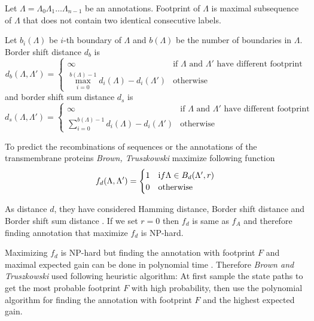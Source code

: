 \begin{definition}
Let $\Lambda=\Lambda_0\Lambda_1\dots\Lambda_{n-1}$ be an annotations. Footprint
of $\Lambda$ is maximal subsequence of $\Lambda$ that does not contain two
identical 
consecutive labels. \label{DEFINITION::FOOTPRINT}
\end{definition}

\begin{definition}
Let $b_i(\Lambda)$ be $i$-th boundary of $\Lambda$ and $b(\Lambda)$ be the
number of boundaries in $\Lambda$.
Border shift distance $d_{b}$ is 
\begin{equation*}
d_{b}(\Lambda,\Lambda') = \begin{cases}
\infty & \text{if $\Lambda$ and $\Lambda'$ have different footprint}\\
\max_{i=0}^{b(\Lambda)-1} d_i(\Lambda)-d_i(\Lambda') & \text{otherwise}
\end{cases}
\end{equation*}
and border shift sum distance $d_s$ is 
\begin{equation*}
d_{s}(\Lambda,\Lambda') = \begin{cases}
\infty & \text{if $\Lambda$ and $\Lambda'$ have different footprint}\\
\sum_{i=0}^{b(\Lambda)-1} d_i(\Lambda)-d_i(\Lambda') & \text{otherwise}
\end{cases}
\end{equation*}

\end{definition}

To predict the recombinations of sequences or the annotations of the
transmembrane proteins {\it Brown,
Truszkowski} maximize following function
\begin{equation*}
f_d(\Lambda,\Lambda') = 
\begin{cases}
1 & {\text if }\Lambda\in B_d(\Lambda',r)\\
0 & \text{otherwise}
\end{cases}
\end{equation*}

As distance $d$, they have considered Hamming distance, Border shift distance
and Border shift sum distance \cite{Brown2010}.  If we set $r=0$ then $f_d$ is
same as $f_A$ and therefore finding annotation that maximize $f_d$ is NP-hard.

Maximizing $f_d$ is NP-hard but finding the  annotation with footprint $F$ and
maximal expected gain can be done in polynomial time \cite{Brown2010}. Therefore
{\it Brown and Truszkowski} used following heuristic algorithm: At first 
sample the state paths to get the most probable footprint $F$ with high probability,
then use the
polynomial algorithm for finding the annotation with footprint $F$ and the highest expected gain.

